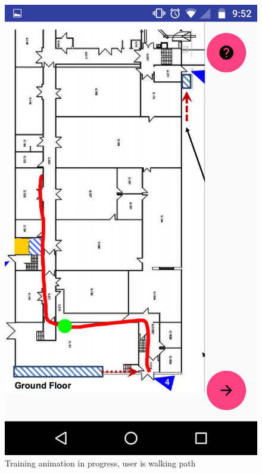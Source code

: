 \documentclass[10.8pt]{article}
\begin{document}
\begin{figure}[H]
    \begin{minipage}[b]{.3\textwidth}  
        \centering  
        \includegraphics[scale=1.2, width=\linewidth]{pic8.png}  
        \caption{Training animation in progress, user is walking path}  
    \end{minipage} 
    \hfill
    \begin{minipage}[b]{.3\textwidth}  
        \centering  

\end{minipage}
\end{figure}
\end{document}
